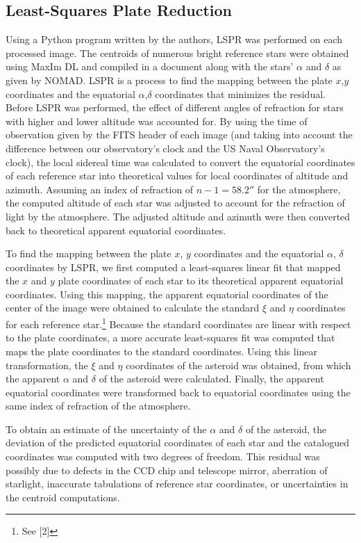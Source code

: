 \documentclass[12pt,journal,compsoc]{IEEEtran}
\begin{document}
\subsection{Least-Squares Plate Reduction}
Using a Python program written by the authors, LSPR was performed on each processed image.
The centroids of numerous bright reference stars were obtained using MaxIm DL and compiled in a document along with the stars' $\alpha$ and $\delta$ as given by NOMAD.
LSPR is a process to find the mapping between the plate $x$,$y$ coordinates and the equatorial $\alpha$,$\delta$ coordinates
that minimizes the residual. 
Before LSPR was performed, the effect of different angles of refraction for stars with higher and lower altitude was accounted for. By using the time of observation given by the FITS header of each image (and taking into account the difference between our observatory's clock and the US Naval Observatory's clock), the local sidereal time was calculated to convert the equatorial coordinates of each reference star into theoretical values for local coordinates of altitude and azimuth.
Assuming an index of refraction of $n-1=58.2''$ for the atmosphere, the computed altitude of each star was adjusted to account for the refraction of light by the atmosphere.
The adjusted altitude and azimuth were then converted back to theoretical apparent equatorial coordinates.

To find the mapping between the plate $x$, $y$ coordinates and the equatorial $\alpha$, $\delta$ coordinates by LSPR, we first computed a least-squares linear fit that mapped the $x$ and $y$ plate coordinates of each star to its theoretical apparent equatorial coordinates.
Using this mapping, the apparent equatorial coordinates of the center of the image were obtained to calculate the standard $\xi$ and $\eta$ coordinates for each reference star.\footnote{See [2]} Because the standard coordinates are linear with respect to the plate coordinates, a more accurate least-squares fit was computed that maps the plate coordinates to the standard coordinates.
Using this linear transformation, the $\xi$ and $\eta$ coordinates of the asteroid was obtained, from which the apparent $\alpha$ and $\delta$ of the asteroid were calculated.
Finally, the apparent equatorial coordinates were transformed back to equatorial coordinates using the same index of refraction of the atmosphere.

To obtain an estimate of the uncertainty of the $\alpha$ and $\delta$ of the asteroid, the deviation of the predicted equatorial coordinates of each star and the catalogued coordinates was computed with two degrees of freedom.
This residual was possibly due to defects in the CCD chip and telescope mirror, aberration of starlight, inaccurate tabulations of reference star coordinates, or uncertainties in the centroid computations.
\end{document}
